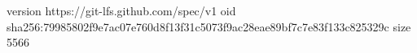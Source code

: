 version https://git-lfs.github.com/spec/v1
oid sha256:79985802f9e7ac07e760d8f13f31c5073f9ac28eae89bf7c7e83f133c825329c
size 5566
